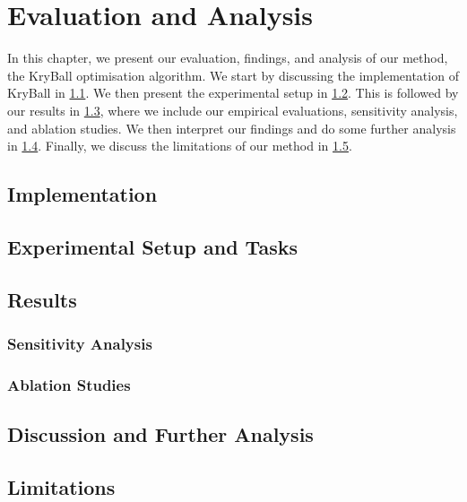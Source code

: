 \chapter{Evaluation and Analysis}
\label{chap:evaluation}

In this chapter, we present our evaluation, findings, and analysis of our method, the KryBall optimisation algorithm. We start by discussing the implementation of KryBall in \ref{sec:implementation}. We then present the experimental setup in \ref{sec:experimental_setup}. This is followed by our results in \ref{sec:results}, where we include our empirical evaluations, sensitivity analysis, and ablation studies. We then interpret our findings and do some further analysis in \ref{sec:discussion_and_further_analysis}. Finally, we discuss the limitations of our method in \ref{sec:limitations}.


\section{Implementation}
\label{sec:implementation}



\section{Experimental Setup and Tasks}
\label{sec:experimental_setup}

\section{Results}
\label{sec:results}

\subsection{Sensitivity Analysis}
\label{ssec:sensitivity_analysis}

\subsection{Ablation Studies}
\label{ssec:ablation_studies}

\section{Discussion and Further Analysis}
\label{sec:discussion_and_further_analysis}

\section{Limitations}
\label{sec:limitations}